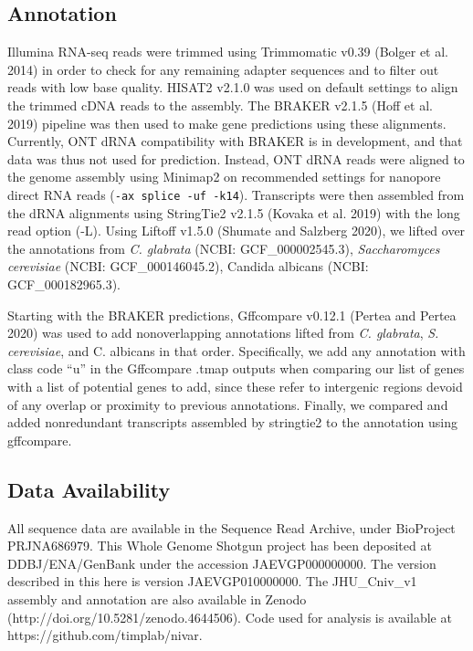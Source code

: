 \subsection{Annotation}
\label{sec:methods}

Illumina RNA-seq reads were trimmed using Trimmomatic v0.39 (Bolger et al. 2014) in order to check for any remaining adapter sequences and to filter out reads with low base quality. HISAT2 v2.1.0 was used on default settings to align the trimmed cDNA reads to the assembly. The BRAKER v2.1.5 (Hoff et al. 2019) pipeline was then used to make gene predictions using these alignments. Currently, ONT dRNA compatibility with BRAKER is in development, and that data was thus not used for prediction. Instead, ONT dRNA reads were aligned to the genome assembly using Minimap2 on recommended settings for nanopore direct RNA reads (\texttt{-ax splice -uf -k14}). Transcripts were then assembled from the dRNA alignments using StringTie2 v2.1.5 (Kovaka et al. 2019) with the long read option (-L). Using Liftoff v1.5.0 (Shumate and Salzberg 2020), we lifted over the annotations from \textit{C. glabrata} (NCBI: GCF\_000002545.3), \textit{Saccharomyces cerevisiae} (NCBI: GCF\_000146045.2), Candida albicans (NCBI: GCF\_000182965.3).

Starting with the BRAKER predictions, Gffcompare v0.12.1 (Pertea and Pertea 2020) was used to add nonoverlapping annotations lifted from \textit{C. glabrata}, \textit{S. cerevisiae}, and C. albicans in that order. Specifically, we add any annotation with class code “u” in the Gffcompare .tmap outputs when comparing our list of genes with a list of potential genes to add, since these refer to intergenic regions devoid of any overlap or proximity to previous annotations. Finally, we compared and added nonredundant transcripts assembled by stringtie2 to the annotation using gffcompare.

\subsection{Data Availability}
\label{sec:methods}

All sequence data are available in the Sequence Read Archive, under BioProject PRJNA686979. This Whole Genome Shotgun project has been deposited at DDBJ/ENA/GenBank under the accession JAEVGP000000000. The version described in this here is version JAEVGP010000000. The JHU\_Cniv\_v1 assembly and annotation are also available in Zenodo (http://doi.org/10.5281/zenodo.4644506). Code used for analysis is available at https://github.com/timplab/nivar.



